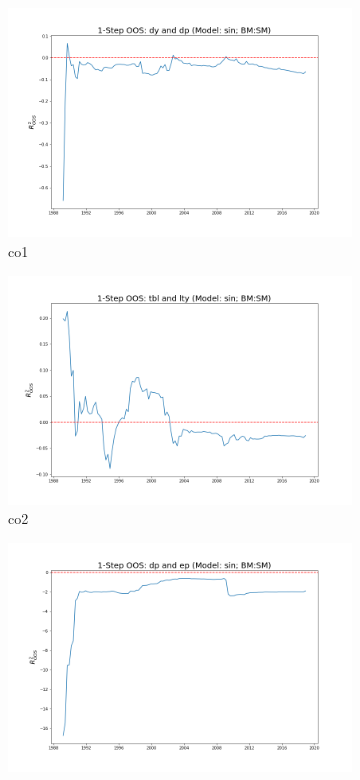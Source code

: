 \documentclass[a4paper,12pt,times,numbered,print,index]{report}
\numberwithin{equation}{section}
\begin{document}
	
	\begin{figure}[!htbp]
		\centering
		\caption{OOS Results for Model with $f_1$}
		\begin{subfigure}[b]{0.42\linewidth}
			\includegraphics[width=0.9\linewidth]{OOS_plots/sin_co1_SM.png}
			\caption{co1}
		\end{subfigure}
		\begin{subfigure}[b]{0.42\linewidth}
			\includegraphics[width=0.9\linewidth]{OOS_plots/sin_co2_SM.png}
			\caption{co2}
		\end{subfigure}
		\begin{subfigure}[b]{0.42\linewidth}
			\includegraphics[width=0.9\linewidth]{OOS_plots/sin_co3_SM.png}

\end{subfigure}
\end{figure}
\end{document}
